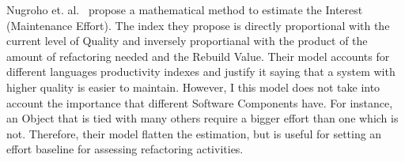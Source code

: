 Nugroho et. al.\ \cite{technicalDebtInterest} propose a mathematical method to estimate the Interest (Maintenance Effort). The index they propose is directly proportional with the current level of Quality and inversely proportianal with the product of the amount of refactoring needed and the Rebuild Value. Their model accounts for different languages productivity indexes and justify it saying that a system with higher quality is easier to maintain. However, I this model does not take into account the importance that different Software Components have. For instance, an Object that is tied with many others require a bigger effort than one which is not. Therefore, their model flatten the estimation, but is useful for setting an effort baseline for assessing refactoring activities. 